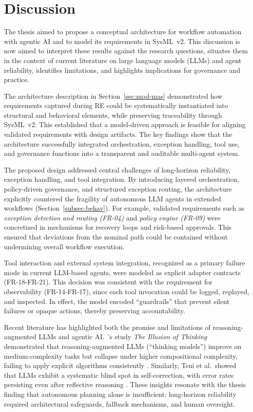 \section{Discussion}\label{sec:discussion}
The thesis aimed to propose a conceptual architecture for workflow automation with agentic AI and to model its requirements in SysML~v2. This discussion is now aimed to interpret these results against the research questions, situates them in the context of current literature on large language models (LLMs) and agent reliability, identifies limitations, and highlights implications for governance and practice.

The architecture description in Section~\ref{sec:mod-mas} demonstrated how requirements captured during RE could be systematically instantiated into structural and behavioral elements, while preserving traceability through SysML~v2. This established that a model-driven approach is feasible for aligning validated requirements with design artifacts. The key findings show that the architecture successfully integrated orchestration, exception handling, tool use, and governance functions into a transparent and auditable multi-agent system.

The proposed design addressed central challenges of long-horizon reliability, exception handling, and tool integration. By introducing layered orchestration, policy-driven governance, and structured exception routing, the architecture explicitly countered the fragility of autonomous LLM agents in extended workflows (Section~\ref{subsec:behav}). For example, validated requirements such as \emph{exception detection and routing (FR-04)} and \emph{policy engine (FR-09)} were concretized in mechanisms for recovery loops and risk-based approvals. This ensured that deviations from the nominal path could be contained without undermining overall workflow execution.

Tool interaction and external system integration, recognized as a primary failure mode in current LLM-based agents, were modeled as explicit adapter contracts (FR-18-FR-21). This decision was consistent with the requirement for observability (FR-14-FR-17), since each tool invocation could be logged, replayed, and inspected. In effect, the model encoded \enquote{guardrails} that prevent silent failures or opaque actions, thereby preserving accountability.

Recent literature has highlighted both the promise and limitations of reasoning-augmented LLMs and agentic AI.~\textcite{shojaeeIllusionThinking2025}'s study \emph{The Illusion of Thinking} demonstrated that reasoning-augmented LLMs (“thinking models”) improve on medium-complexity tasks but collapse under higher compositional complexity, failing to apply explicit algorithms consistently \parencite{shojaeeIllusionThinking2025}. Similarly, Tsui et al.\ showed that LLMs exhibit a systematic blind spot in self-correction, with error rates persisting even after reflective reasoning \parencite{tsuiSelfCorrectionBlindspot2025}. These insights resonate with the thesis finding that autonomous planning alone is insufficient: long-horizon reliability required architectural safeguards, fallback mechanisms, and human oversight. 

